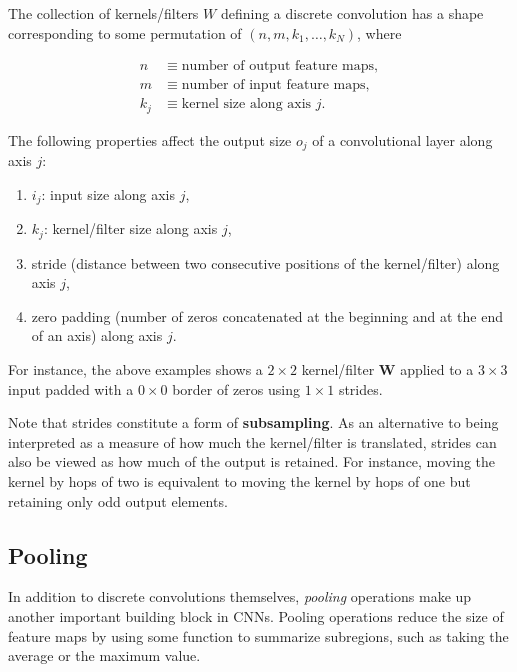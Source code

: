 \documentclass[%
oneside,                 %
final,                   %
10pt]{article}
\begin{document}
The collection of kernels/filters $W$ defining a discrete convolution has a shape
corresponding to some permutation of $(n, m, k_1, \ldots, k_N)$, where

\begin{equation*}
\begin{split}
    n &\equiv \text{number of output feature maps},\\
    m &\equiv \text{number of input feature maps},\\
    k_j &\equiv \text{kernel size along axis $j$}.
\end{split}
\end{equation*}

The following properties affect the output size $o_j$ of a convolutional layer
along axis $j$:

\begin{enumerate}
\item $i_j$: input size along axis $j$,

\item $k_j$: kernel/filter size along axis $j$,

\item stride (distance between two consecutive positions of the kernel/filter) along axis $j$,

\item zero padding (number of zeros concatenated at the beginning and at the end of an axis) along axis $j$.
\end{enumerate}

\noindent
For instance, the above examples shows a  $2\times 2$ kernel/filter $\bm{W}$  applied to a $3 \times 3$ input padded with a $0 \times 0$
border of zeros using $1 \times 1$ strides.

Note that strides constitute a form of \textbf{subsampling}. As an alternative to
being interpreted as a measure of how much the kernel/filter is translated, strides
can also be viewed as how much of the output is retained. For instance, moving
the kernel by hops of two is equivalent to moving the kernel by hops of one but
retaining only odd output elements.

\subsection{Pooling}

In addition to discrete convolutions themselves, {\em pooling\/} operations
make up another important building block in CNNs. Pooling operations reduce
the size of feature maps by using some function to summarize subregions, such
as taking the average or the maximum value.
\end{document}
